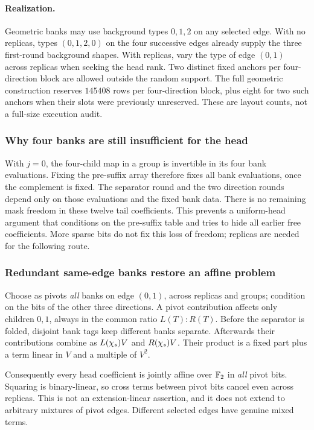 \paragraph{Realization.} Geometric banks may use background types $0,1,2$ on any selected edge. With no replicas, types $(0,1,2,0)$ on the four successive edges already supply the three first-round background shapes. With replicas, vary the type of edge $(0,1)$ across replicas when seeking the head rank. Two distinct fixed anchors per four-direction block are allowed outside the random support. The full geometric construction reserves $145408$ rows per four-direction block, plus eight for two such anchors when their slots were previously unreserved. These are layout counts, not a full-size execution audit.

\subsubsection{Why four banks are still insufficient for the head}

With $j=0$, the four-child map in a group is invertible in its four bank evaluations. Fixing the pre-suffix array therefore fixes all bank evaluations, once the complement is fixed. The separator round and the two direction rounds depend only on those evaluations and the fixed bank data. There is no remaining mask freedom in these twelve tail coefficients. This prevents a uniform-head argument that conditions on the pre-suffix table and tries to hide all earlier free coefficients. More sparse bits do not fix this loss of freedom; replicas are needed for the following route.

\subsubsection{Redundant same-edge banks restore an affine problem}

Choose as pivots \emph{all} banks on edge $(0,1)$, across replicas and groups; condition on the bits of the other three directions. A pivot contribution affects only children $0,1$, always in the common ratio $L(T):R(T)$. Before the separator is folded, disjoint bank tags keep different banks separate. Afterwards their contributions combine as $L(\chi_s)V$ and $R(\chi_s)V$. Their product is a fixed part plus a term linear in $V$ and a multiple of $V^2$.

Consequently every head coefficient is jointly affine over $\mathbb{F}_2$ in \emph{all} pivot bits. Squaring is binary-linear, so cross terms between pivot bits cancel even across replicas. This is not an extension-linear assertion, and it does not extend to arbitrary mixtures of pivot edges. Different selected edges have genuine mixed terms.

